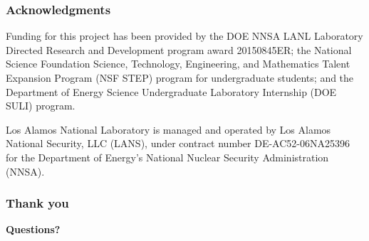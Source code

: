 \documentclass{beamer}
\begin{document}
\begin{frame}
  \frametitle{Acknowledgments}

  \footnotesize{Funding for this project has been provided by the DOE
    NNSA LANL Laboratory Directed Research and Development program
    award 20150845ER; the National Science Foundation Science,
    Technology, Engineering, and Mathematics Talent Expansion Program
    (NSF STEP) program for undergraduate students; and the Department
    of Energy Science Undergraduate Laboratory Internship (DOE SULI)
    program.}

  \vspace{0.2in}
  
  \footnotesize{Los Alamos National Laboratory is managed and operated
    by Los Alamos National Security, LLC (LANS), under contract number
    DE-AC52-06NA25396 for the Department of Energy’s National Nuclear
    Security Administration (NNSA).}
\end{frame}


\begin{frame}
  \frametitle{Thank you}
  \textbf{Questions?}
\end{frame}
\end{document}
